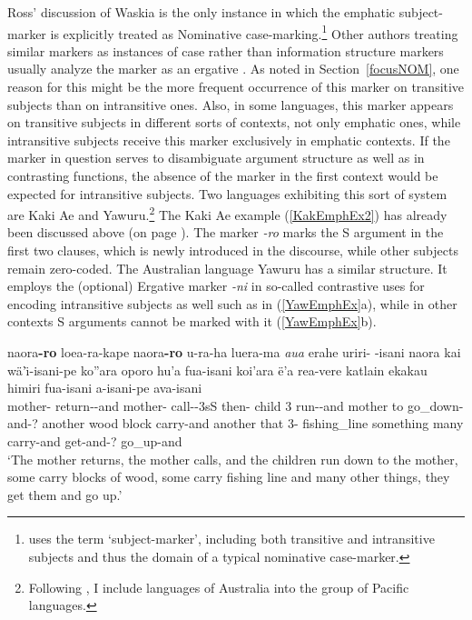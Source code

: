 \enlargethispage{\baselineskip}Ross' discussion of Waskia is the only instance in which the emphatic subject-marker is explicitly treated as Nominative case-marking.\footnote{\citet{Ross:1978} uses the term `subject-marker', including both transitive and intransitive subjects and thus the domain of a typical nominative case-marker.}
Other authors treating similar markers as instances of case rather than information structure markers usually analyze the marker as an ergative .
As noted in Section~\ref{focusNOM}, one reason for this might be the more frequent occurrence of this marker on transitive subjects than on intransitive ones. 
Also, in some languages, this marker appears on transitive subjects in different sorts of contexts, not only emphatic ones, while intransitive subjects receive this marker exclusively in emphatic contexts. 
If the marker in question serves to disambiguate argument structure as well as in contrasting functions, the absence of the marker in the first context would be expected for intransitive subjects. 
Two languages exhibiting this sort of system are Kaki Ae and Yawuru.\footnote{Following \citet{Lynch:1998}, I include languages of Australia into the group of Pacific languages.} 
The Kaki Ae example (\ref{KakEmphEx2}) has already been discussed above (on page ). 
The marker \emph{-ro} marks the S argument in the first two clauses, which is newly introduced in the discourse, while other subjects remain zero-coded.
The Australian language Yawuru has a similar structure. 
It employs the (optional) Ergative marker \emph{-ni} in so-called contrastive uses for encoding intransitive subjects as well such as in (\ref{YawEmphEx}a), while in other contexts S arguments cannot be marked with it (\ref{YawEmphEx}b).
 
\begin{exe} \ex\label{KakEmphEx2}
\gll naora\textbf{-ro} loea-ra-kape naora\textbf{-ro} u-ra-ha luera-ma \emph{aua} erahe uriri-\rdp{}%
-isani naora kai w\"a'\"\i-isani-pe ko''ara oporo hu'a fua-isani koi'ara \"e'a rea-vere katlain ekakau himiri fua-isani a-isani-pe ava-isani\\
mother-\erg{} return-\irr{}-and mother-\erg{} call-\irr{}-3sS then-\loc{} child 3\pl{} run-\rdp-and mother to go\_down-and-? another wood block carry-and another that 3\sg{}-\poss{} fishing\_line something many carry-and get-and-? go\_up-and\\
\glt `The mother returns, the mother calls, and the children run down to the mother, some carry blocks of wood, some carry fishing line and many other things, they get them and go up.'
\end{exe}


